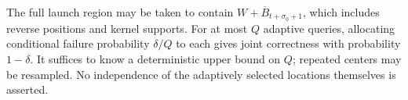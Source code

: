 The full launch region may be taken to contain
$W+\overline B_{t+\sigma_0+1}$, which includes reverse positions and
kernel supports. For at most $Q$ adaptive queries, allocating conditional
failure probability $\delta/Q$ to each gives joint correctness with
probability $1-\delta$. It suffices to know a deterministic upper bound
on $Q$; repeated centers may be resampled. No independence of the
adaptively selected locations themselves is asserted.
